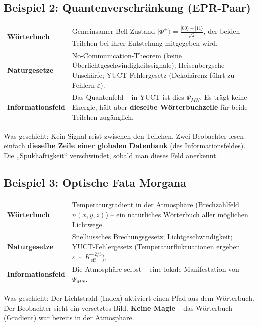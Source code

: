 \documentclass[12pt,a4paper]{article}
\begin{document}
	\subsection{Beispiel 2: Quantenverschränkung (EPR-Paar)}
	\begin{tabular}{p{2.8cm} p{10cm}}
		\textbf{Wörterbuch} & Gemeinsamer Bell-Zustand \(|\Phi^+\rangle = \frac{|00\rangle + |11\rangle}{\sqrt{2}}\), der beiden Teilchen bei ihrer Entstehung mitgegeben wird. \\
		\textbf{Naturgesetze} & No-Communication-Theorem (keine Überlichtgeschwindigkeitssignale); Heisenbergsche Unschärfe; YUCT-Fehlergesetz (Dekohärenz führt zu Fehlern \(\varepsilon\)). \\
		\textbf{Informationsfeld} & Das Quantenfeld – in YUCT ist dies \(\Psi_{MN}\). Es trägt keine Energie, hält aber \textbf{dieselbe Wörterbuchzeile} für beide Teilchen zugänglich. \\
	\end{tabular}
	
	\noindent Was geschieht: Kein Signal reist zwischen den Teilchen. Zwei Beobachter lesen einfach \textbf{dieselbe Zeile einer globalen Datenbank} (des Informationsfeldes). Die „Spukhaftigkeit“ verschwindet, sobald man dieses Feld anerkennt.
	
	\subsection{Beispiel 3: Optische Fata Morgana}
	\begin{tabular}{p{2.8cm} p{10cm}}
		\textbf{Wörterbuch} & Temperaturgradient in der Atmosphäre (Brechzahlfeld \(n(x,y,z)\)) – ein natürliches Wörterbuch aller möglichen Lichtwege. \\
		\textbf{Naturgesetze} & Snelliussches Brechungsgesetz; Lichtgeschwindigkeit; YUCT-Fehlergesetz (Temperaturfluktuationen ergeben \(\varepsilon \sim K_{\mathrm{eff}}^{-2/3}\)). \\
		\textbf{Informationsfeld} & Die Atmosphäre selbst – eine lokale Manifestation von \(\Psi_{MN}\). \\
	\end{tabular}
	
	\noindent Was geschieht: Der Lichtstrahl (Index) aktiviert einen Pfad aus dem Wörterbuch. Der Beobachter sieht ein versetztes Bild. \textbf{Keine Magie} – das Wörterbuch (Gradient) war bereits in der Atmosphäre.
	
\end{document}
